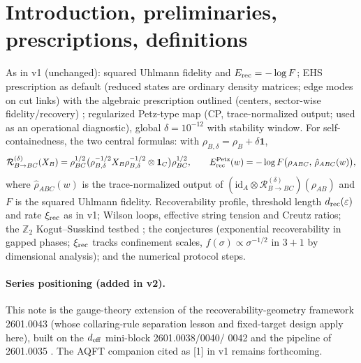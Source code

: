 \documentclass[11pt]{article}
\theoremstyle{remark}
\newcommand{\Erec}{E^{\rm Petz}_{\rm rec}}
\begin{document}
\section{Introduction, preliminaries, prescriptions, definitions}
As in v1 (unchanged): squared Uhlmann fidelity and $E_{\rm rec} = -\log
F$; EHS prescription as default (reduced states are ordinary density
matrices; edge modes on cut links) with the algebraic prescription
outlined (centers, sector-wise fidelity/recovery) \cite{Donnelly, CHR};
regularized Petz-type map (CP, trace-normalized output; used as an
operational diagnostic), global $\delta = 10^{-12}$ with stability
window. For self-containedness, the two central formulas: with
$\rho_{B,\delta} = \rho_B + \delta\mathbf{1}$,
\[
\mathcal{R}^{(\delta)}_{B\to BC}(X_B) = \rho_{BC}^{1/2}
\bigl(\rho_{B,\delta}^{-1/2} X_B \rho_{B,\delta}^{-1/2} \otimes
\mathbf{1}_C\bigr) \rho_{BC}^{1/2},
\qquad
\Erec(w) = -\log F\bigl(\rho_{ABC},\, \hat\rho_{ABC}(w)\bigr),
\]
where $\hat\rho_{ABC}(w)$ is the trace-normalized output of
$(\mathrm{id}_A \otimes \mathcal{R}^{(\delta)}_{B\to BC})(\rho_{AB})$
and $F$ is the squared Uhlmann fidelity. Recoverability profile,
threshold length $d_{\rm rec}(\varepsilon)$ and rate $\xi_{\rm rec}$ as
in v1;
Wilson loops, effective string tension and Creutz ratios; the
$\mathbb{Z}_2$ Kogut--Susskind testbed \cite{Kogut}; the conjectures
(exponential recoverability in gapped phases; $\xi_{\rm rec}$ tracks
confinement scales, $f(\sigma) \propto \sigma^{-1/2}$ in $3{+}1$ by
dimensional analysis); and the numerical protocol steps.

\paragraph{Series positioning (added in v2).} This note is the
gauge-theory extension of the recoverability-geometry framework 2601.0043
\cite{S0043} (whose collaring-rule separation lesson and fixed-target
design apply here), built on the $d_{\rm eff}$ mini-block 2601.0038/0040/
0042 \cite{S0038, S0040, S0042} and the pipeline of 2601.0035
\cite{S0035}. The AQFT companion cited as [1] in v1 remains forthcoming.
\end{document}
